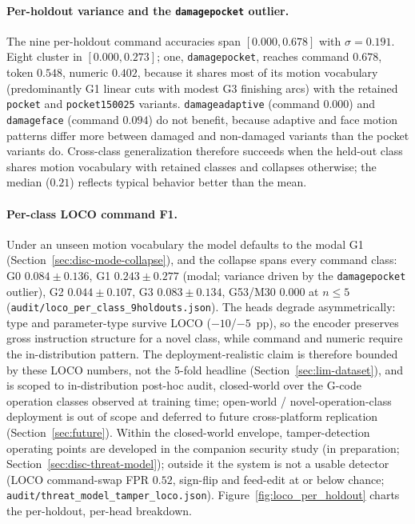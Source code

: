 \documentclass[sensors,article,submit,moreauthors,pdftex]{Definitions/mdpi}
\begin{document}
\paragraph{Per-holdout variance and the \texttt{damagepocket} outlier.} The nine per-holdout command accuracies span $[0.000, 0.678]$ with $\sigma = 0.191$. Eight cluster in $[0.000, 0.273]$; one, \texttt{damagepocket}, reaches command $0.678$, token $0.548$, numeric $0.402$, because it shares most of its motion vocabulary (predominantly G1 linear cuts with modest G3 finishing arcs) with the retained \texttt{pocket} and \texttt{pocket150025} variants. \texttt{damageadaptive} (command $0.000$) and \texttt{damageface} (command $0.094$) do not benefit, because adaptive and face motion patterns differ more between damaged and non-damaged variants than the pocket variants do. Cross-class generalization therefore succeeds when the held-out class shares motion vocabulary with retained classes and collapses otherwise; the median ($0.21$) reflects typical behavior better than the mean.

\paragraph{Per-class LOCO command F1.} Under an unseen motion vocabulary the model defaults to the modal G1 (Section~\ref{sec:disc-mode-collapse}), and the collapse spans every command class: G0 $0.084 \pm 0.136$, G1 $0.243 \pm 0.277$ (modal; variance driven by the \texttt{damagepocket} outlier), G2 $0.044 \pm 0.107$, G3 $0.083 \pm 0.134$, G53/M30 $0.000$ at $n\!\le\!5$ (\texttt{audit/loco\_per\_class\_9holdouts.json}). The heads degrade asymmetrically: type and parameter-type survive LOCO ($-10$/$-5$~pp), so the encoder preserves gross instruction structure for a novel class, while command and numeric require the in-distribution pattern. The deployment-realistic claim is therefore bounded by these LOCO numbers, not the 5-fold headline (Section~\ref{sec:lim-dataset}), and is scoped to in-distribution post-hoc audit, closed-world over the G-code operation classes observed at training time; open-world / novel-operation-class deployment is out of scope and deferred to future cross-platform replication (Section~\ref{sec:future}). Within the closed-world envelope, tamper-detection operating points are developed in the companion security study (in preparation; Section~\ref{sec:disc-threat-model}); outside it the system is not a usable detector (LOCO command-swap FPR $0.52$, sign-flip and feed-edit at or below chance; \texttt{audit/threat\_model\_tamper\_loco.json}). Figure~\ref{fig:loco_per_holdout} charts the per-holdout, per-head breakdown.
\end{document}
